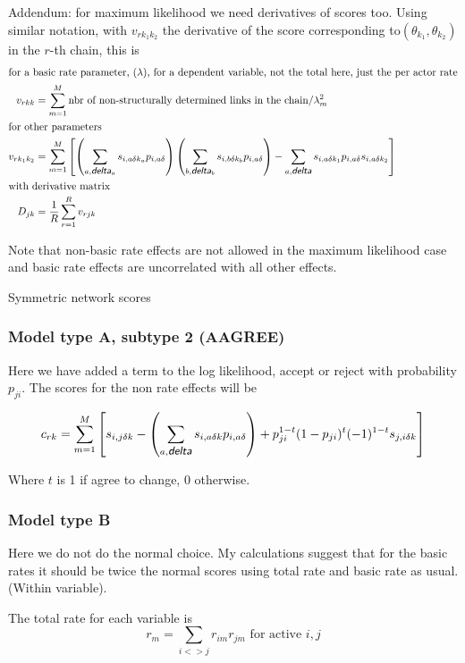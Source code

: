 \documentclass[12pt,a4paper]{article}
\makeatletter
\renewcommand{\=}{\,=\,}
\newcommand{\+}{\,+\,}
\newcommand{\nnm}[1]{\textsf{\small\textit{#1}}}
\renewcommand{\subsection}{\@startsection{subsection}{2}
                {0pt}{0.7\baselineskip}{0.3\baselineskip}
                {\sffamily} }
\makeatother
\begin{document}
Addendum: for maximum likelihood we need derivatives of scores too. Using
similar notation, with $v_{rk_1k_2}$ the derivative of the score corresponding
to$(\theta_{k_1}, \theta_{k_2})$  in the $r$-th chain,  this is
\begin{align*}
\intertext{for a basic rate parameter, $(\lambda)$, for a
dependent variable, not the total here, just the per actor rate}
v_{rkk} &= \sum_{m=1}^M  \textrm{nbr of non-structurally determined links in the
  chain}/ \lambda_m^2\\
\intertext{for other parameters}
v_{rk_1k_2}&= \sum_{m=1}^M \left [  \left( \sum_{a, \nnm{delta}_a}
  s_{i,a\delta k_a} p_{i,a\delta} \right) \left (
\sum_{ b, \nnm{delta}_b} s_{i,b\delta k_b} p_{i,a\delta} \right) -
\sum_{a, \nnm{delta}}
  s_{i,a\delta k_1}p_{i,a\delta}  s_{i,a\delta k_2}
\right ]\\
\intertext{with derivative matrix}
 D_{jk}&=\frac{1}{R}\sum_{r=1}^R v_{rjk}
\end{align*}

Note that non-basic rate effects are not allowed in the maximum likelihood
case and basic rate effects are uncorrelated with all other effects.

\subsection{Symmetric network scores}
\label{sec:symScores}
\subsubsection{Model type A, subtype 2 (AAGREE)}
Here we have added a term to the log likelihood, accept or reject with
probability $p_{ji}$.
The scores for the non rate effects will be

$$c_{rk}= \sum_{m=1}^M \left [ s_{i,j\delta k}- \left(\sum_{a,\nnm{delta}}
  s_{i,a\delta k}p_{i,a\delta}\right) +
p_{ji}^{1-t} (1-p_{ji})^t (-1)^{1-t}s_{j,i\delta
  k}\right]$$

Where $t$ is 1 if agree to change, 0 otherwise.
\subsubsection{Model type B}
Here we do not do the normal choice. My calculations suggest that for the basic
rates it should be twice the normal scores using total rate and basic rate as
usual. (Within variable).

The total rate for each variable is
$$r_m = \sum_{i<>j} r_{im} r_{jm} \text{ for active }i, j$$
\end{document}
